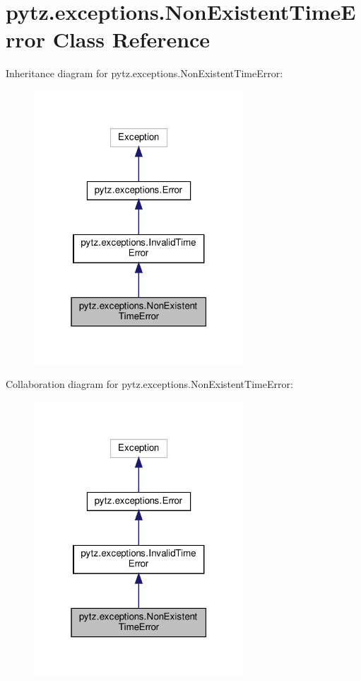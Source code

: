 \hypertarget{classpytz_1_1exceptions_1_1NonExistentTimeError}{}\section{pytz.\+exceptions.\+Non\+Existent\+Time\+Error Class Reference}
\label{classpytz_1_1exceptions_1_1NonExistentTimeError}


Inheritance diagram for pytz.\+exceptions.\+Non\+Existent\+Time\+Error\+:
\nopagebreak
\begin{figure}[H]
\begin{center}
\leavevmode
\includegraphics[width=223pt]{classpytz_1_1exceptions_1_1NonExistentTimeError__inherit__graph}
\end{center}
\end{figure}


Collaboration diagram for pytz.\+exceptions.\+Non\+Existent\+Time\+Error\+:
\nopagebreak
\begin{figure}[H]
\begin{center}
\leavevmode
\includegraphics[width=223pt]{classpytz_1_1exceptions_1_1NonExistentTimeError__coll__graph}
\end{center}
\end{figure}



